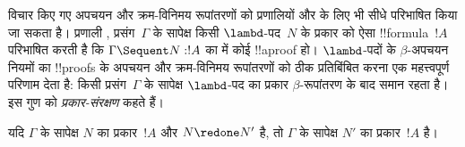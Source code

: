 \documentclass[../../../include/open-logic-section]{subfiles}
\begin{document}


विचार किए गए अपचयन और क्रम-विनिमय रूपांतरणों को प्रणालियों  और
 के लिए भी सीधे परिभाषित किया जा सकता है। प्रणाली ,
प्रसंग~$\Gamma$ के सापेक्ष किसी $\lambd$-पद~$N$ के प्रकार को ऐसा
!!{formula}~$!A$ परिभाषित करती है कि $\Gamma \Sequent N : !A$ का 
में कोई !!a{proof} हो। $\lambd$-पदों के $\beta$-अपचयन नियमों का !!{proof}s के
अपचयन और क्रम-विनिमय रूपांतरणों को ठीक प्रतिबिंबित करना एक महत्त्वपूर्ण परिणाम
देता है: किसी प्रसंग~$\Gamma$ के सापेक्ष $\lambd$-पद का प्रकार
$\beta$-रूपांतरण के बाद समान रहता है। इस गुण को \emph{प्रकार-संरक्षण} कहते हैं।

\begin{prop}
यदि $\Gamma$ के सापेक्ष $N$ का प्रकार~$!A$ और $N \redone N'$ है, तो $\Gamma$
के सापेक्ष $N'$ का प्रकार~$!A$ है।
\end{prop}
\end{document}
